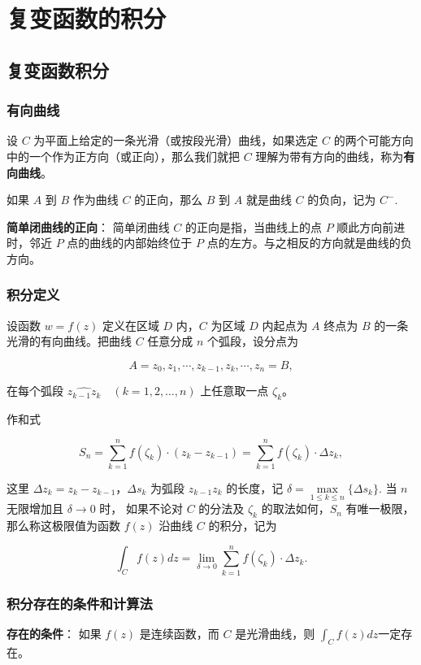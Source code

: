 \section{复变函数的积分}
\label{复变函数的积分}
\subsection{复变函数积分}
\label{复变函数积分}
\subsubsection{有向曲线}
\label{有向曲线}
设 \(C\) 为平面上给定的一条光滑（或按段光滑）曲线，如果选定 \(C\)
的两个可能方向中的一个作为正方向（或正向），那么我们就把 \(C\)
理解为带有方向的曲线，称为\textbf{有向曲线}。

如果 \(A\) 到 \(B\) 作为曲线 \(C\) 的正向，那么 \(B\) 到 \(A\) 就是曲线
\(C\) 的负向，记为 \(C^{-}\).

\textbf{简单闭曲线的正向}： 简单闭曲线 \(C\) 的正向是指，当曲线上的点 \(P\)
顺此方向前进时，邻近 \(P\) 点的曲线的内部始终位于 \(P\)
点的左方。与之相反的方向就是曲线的负方向。
\subsubsection{积分定义}
\label{积分定义}
设函数 \(w = f(z)\) 定义在区域 \(D\) 内，\(C\) 为区域 \(D\) 内起点为
\(A\) 终点为 \(B\) 的一条光滑的有向曲线。把曲线 \(C\) 任意分成 \(n\)
个弧段，设分点为

\[
A = z_0, z_1, \cdots, z_{k-1}, z_k, \cdots, z_n = B,
\]

在每个弧段 \(\widehat{z_{k-1}z_k}\quad (k = 1, 2, \dots, n )\)
上任意取一点 \(\zeta_k\)。

作和式

\[
S_{n} = \sum_{k=1}^{n} f(\zeta_{k}) \cdot (z_{k} - z_{k-1}) = \sum_{k=1}^{n} f(\zeta_{k}) \cdot \Delta z_{k},
\]

这里 \(\Delta z_{k} = z_{k} - z_{k-1}\)，\(\Delta s_{k}\) 为弧段 \(z_{k-1}z_{k}\) 的长度，记
\(\delta = \max\limits_{1 \leq k \leq n} \{\Delta s_{k}\}\). 当 \(n\) 无限增加且 \(\delta \to 0\) 时，
如果不论对 \(C\) 的分法及 \(\zeta_{k}\) 的取法如何，\(S_{n}\) 有唯一极限，
那么称这极限值为函数 \(f(z)\) 沿曲线 \(C\) 的积分，记为

\[
\int_{C} f(z)dz=\lim_{\delta \to 0}\sum^n_{k=1}f(\zeta_k)\cdot \Delta z_k.
\]
\subsubsection{积分存在的条件和计算法}
\label{积分存在的条件和计算法}
\textbf{存在的条件}： 如果 \(f(z)\) 是连续函数，而 \(C\) 是光滑曲线，则
\(\int_C f(z)dz\)一定存在。

